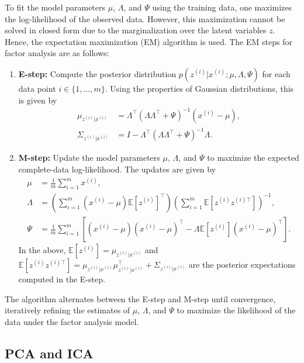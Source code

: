 \documentclass[a4paper,11pt]{article}
\numberwithin{equation}{section}
\begin{document}
{	To fit the model parameters $\mu$, $\Lambda$, and $\Psi$ using the training data, one maximizes the log-likelihood of the observed data. However, this maximization cannot be solved in closed form due to the marginalization over the latent variables $z$. Hence, the expectation maximization (EM) algorithm is used. The EM steps for factor analysis are as follows:
	\begin{enumerate}
		\item \textbf{E-step:} Compute the posterior distribution $p(z^{(i)}|x^{(i)}; \mu, \Lambda, \Psi)$ for each data point $i \in \{1, \dots, m\}$. Using the properties of Gaussian distributions, this is given by
		\begin{align}
			\mu_{z^{(i)}|x^{(i)}} &= \Lambda^\top (\Lambda \Lambda^\top + \Psi)^{-1}(x^{(i)} - \mu), \\
			\Sigma_{z^{(i)}|x^{(i)}} &= I - \Lambda^\top (\Lambda \Lambda^\top + \Psi)^{-1} \Lambda.
		\end{align}
		\item \textbf{M-step:} Update the model parameters $\mu$, $\Lambda$, and $\Psi$ to maximize the expected complete-data log-likelihood. The updates are given by
		\begin{align}
			\mu &= \frac{1}{m} \sum_{i=1}^m x^{(i)}, \\
			\Lambda &= \left( \sum_{i=1}^m (x^{(i)} - \mu) \mathbb{E}[z^{(i)}]^\top \right) \left( \sum_{i=1}^m \mathbb{E}[z^{(i)} z^{(i)\top}] \right)^{-1}, \\
			\Psi &= \frac{1}{m} \sum_{i=1}^m \left[ (x^{(i)} - \mu)(x^{(i)} - \mu)^\top - \Lambda \mathbb{E}[z^{(i)}](x^{(i)} - \mu)^\top \right].
		\end{align}
		In the above, $\mathbb{E}[z^{(i)}] = \mu_{z^{(i)}|x^{(i)}}$ and $\mathbb{E}[z^{(i)} z^{(i)\top}] = \mu_{z^{(i)}|x^{(i)}} \mu_{z^{(i)}|x^{(i)}}^\top + \Sigma_{z^{(i)}|x^{(i)}}$ are the posterior expectations computed in the E-step.
	\end{enumerate}
	
	The algorithm alternates between the E-step and M-step until convergence, iteratively refining the estimates of $\mu$, $\Lambda$, and $\Psi$ to maximize the likelihood of the data under the factor analysis model.}


\subsection{PCA and ICA} %
\end{document}

